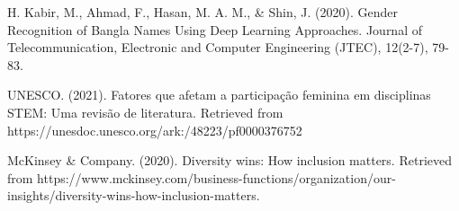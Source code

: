 \documentclass[conference,compsoc]{IEEEtran}
\begin{document}
\begin{thebibliography}{1}
H. Kabir, M., Ahmad, F., Hasan, M. A. M., & Shin, J. (2020). Gender Recognition of Bangla Names Using Deep Learning Approaches. Journal of Telecommunication, Electronic and Computer Engineering (JTEC), 12(2-7), 79-83.


UNESCO. (2021). Fatores que afetam a participação feminina em disciplinas STEM: Uma revisão de literatura. Retrieved from https://unesdoc.unesco.org/ark:/48223/pf0000376752

McKinsey & Company. (2020). Diversity wins: How inclusion matters. Retrieved from https://www.mckinsey.com/business-functions/organization/our-insights/diversity-wins-how-inclusion-matters.

\end{thebibliography}




\end{document}
